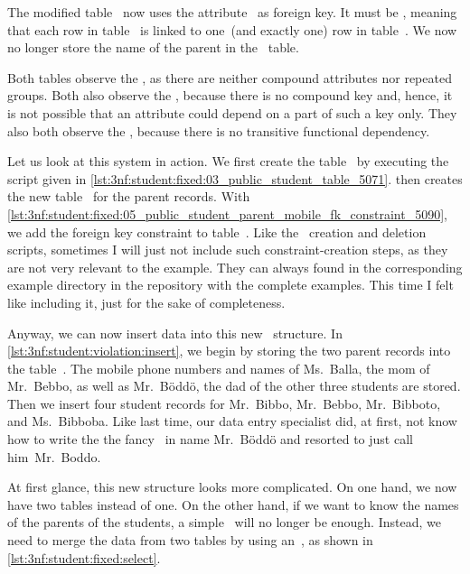 The modified table~ now uses the attribute~ as foreign key.
It must be , meaning that each row in table~ is linked to one~(and exactly one) row in table~.
We now no longer store the name of the parent in the ~table.

Both tables observe the , as there are neither compound attributes nor repeated groups.
Both also observe the , because there is no compound key and, hence, it is not possible that an attribute could depend on a part of such a key only.
They also both observe the , because there is no transitive functional dependency.

Let us look at this system in action.
We first create the table~ by executing the script given in \cref{lst:3nf:student:fixed:03_public_student_table_5071}.
 then creates the new table~ for the parent records.
With \cref{lst:3nf:student:fixed:05_public_student_parent_mobile_fk_constraint_5090}, we add the foreign key constraint to table~.
Like the \db\ creation and deletion scripts, sometimes I will just not include such constraint-creation steps, as they are not very relevant to the example.
They can always found in the corresponding example directory in the repository \href{\xdef\databasesCodeRepo}{\databasesCodeRepoName} with the complete examples.
This time I felt like including it, just for the sake of completeness.

Anyway, we can now insert data into this new \db\ structure.
In \cref{lst:3nf:student:violation:insert}, we begin by storing the two parent records into the table~.
The mobile phone numbers and names of Ms.~Balla, the mom of Mr.~Bebbo, as well as Mr.~B{\"o}dd{\"o}, the dad of the other three students are stored.
Then we insert four student records for Mr.~Bibbo, Mr.~Bebbo, Mr.~Bibboto, and Ms.~Bibboba.
Like last time, our data entry specialist did, at first, not know how to write the the fancy~ in name Mr.~B{\"o}dd{\"o} and resorted to just call him~Mr.~Boddo.

At first glance, this new structure looks more complicated.
On one hand, we now have two tables instead of one.
On the other hand, if we want to know the names of the parents of the students, a simple~ will no longer be enough.
Instead, we need to merge the data from two tables by using an~, as shown in \cref{lst:3nf:student:fixed:select}.

